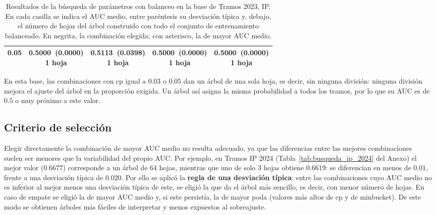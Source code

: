 \documentclass[twoside,a4paper,12pt,onecolumn,openany]{book}
\begin{document}
\begin{table}[H]
\begin{tabular}{r|cccc}
0.05 & \shortstack{0.5000~(0.0000)\\ 1 hoja} & \shortstack{0.5113~(0.0398)\\ 1 hoja} & \shortstack{0.5000~(0.0000)\\ 1 hoja} & \shortstack{0.5000~(0.0000)\\ 1 hoja} \\[4pt]
\bottomrule
\end{tabular}
\caption{Resultados de la búsqueda de parámetros con balanceo en la base de Tramos 2023, IP. En cada casilla se indica el AUC medio, entre paréntesis su desviación típica y, debajo, el número de hojas del árbol construido con todo el conjunto de entrenamiento balanceado. En negrita, la combinación elegida; con asterisco, la de mayor AUC medio.}
\label{tab:busqueda_ip_2023}
\end{table}
 
 
En esta base, las combinaciones con cp igual a $0.03$ o $0.05$ dan un árbol de una sola hoja, es decir, sin ninguna división: ninguna división mejora el ajuste del árbol en la proporción exigida. Un árbol así asigna la misma probabilidad a todos los tramos, por lo que su AUC es de $0.5$ o muy próximo a este valor.
 
\subsection{Criterio de selección}
 
Elegir directamente la combinación de mayor AUC medio no resulta adecuado, ya que las diferencias entre las mejores combinaciones suelen ser menores que la variabilidad del propio AUC. Por ejemplo, en Tramos IP 2024 (Tabla~\ref{tab:busqueda_ip_2024} del Anexo) el mejor valor ($0.6677$) corresponde a un árbol de 64 hojas, mientras que uno de solo 3 hojas obtiene $0.6619$: se diferencian en menos de $0.01$, frente a una desviación típica de $0.020$. Por ello se aplicó la \textbf{regla de una desviación típica}: entre las combinaciones cuyo AUC medio no es inferior al mejor menos una desviación típica de este, se eligió la que da el árbol más sencillo, es decir, con menor número de hojas. En caso de empate se eligió la de mayor AUC medio y, si este persistía, la de mayor poda (valores más altos de cp y de minbucket). De este modo se obtienen árboles más fáciles de interpretar y menos expuestos al sobreajuste.
 
\vspace{0.5cm}
 
\end{document}
